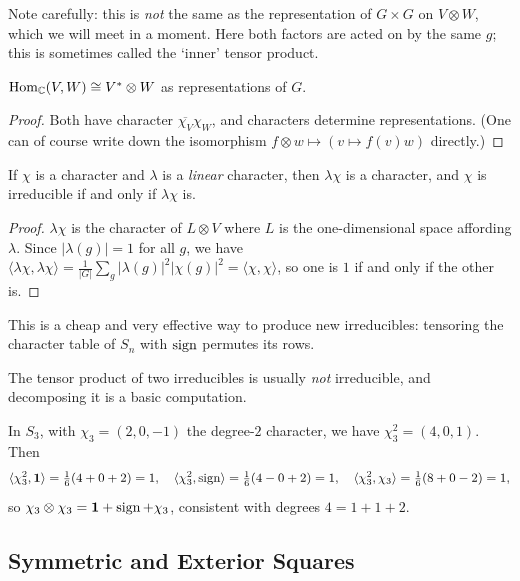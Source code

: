 \documentclass[a4paper]{scrartcl}
\newcommand{\Hom}{\operatorname{Hom}}
\newcommand{\ip}[2]{\langle #1, #2 \rangle}
\begin{document}
\begin{remark}
	Note carefully: this is \emph{not} the same as the representation of $G\times G$ on $V\otimes W$, which we will meet in a moment. Here both factors are acted on by the same $g$; this is sometimes called the `inner' tensor product.
\end{remark}

\begin{corollary}
	$\Hom_\C(V,W) \cong V^*\otimes W$ as representations of $G$.
\end{corollary}
\begin{proof}
	Both have character $\overline{\chi_V}\chi_W$, and characters determine representations. (One can of course write down the isomorphism $f\otimes w\mapsto (v\mapsto f(v)w)$ directly.)
\end{proof}

\begin{proposition}
	If $\chi$ is a character and $\lambda$ is a \emph{linear} character, then $\lambda\chi$ is a character, and $\chi$ is irreducible if and only if $\lambda\chi$ is.
\end{proposition}
\begin{proof}
	$\lambda\chi$ is the character of $L\otimes V$ where $L$ is the one-dimensional space affording $\lambda$. Since $|\lambda(g)| = 1$ for all $g$, we have $\ip{\lambda\chi}{\lambda\chi} = \frac1{|G|}\sum_g|\lambda(g)|^2|\chi(g)|^2 = \ip\chi\chi$, so one is $1$ if and only if the other is.
\end{proof}

This is a cheap and very effective way to produce new irreducibles: tensoring the character table of $S_n$ with $\operatorname{sign}$ permutes its rows.

The tensor product of two irreducibles is usually \emph{not} irreducible, and decomposing it is a basic computation.

\begin{example}
	In $S_3$, with $\chi_3 = (2,0,-1)$ the degree-$2$ character, we have $\chi_3^2 = (4,0,1)$. Then
	$$\ip{\chi_3^2}{\mathbf 1} = \tfrac16(4 + 0 + 2) = 1, \quad \ip{\chi_3^2}{\sign} = \tfrac16(4 - 0 + 2) = 1, \quad \ip{\chi_3^2}{\chi_3} = \tfrac16(8 + 0 - 2) = 1,$$
	so $\chi_3\otimes\chi_3 = \mathbf 1 + \operatorname{sign} + \chi_3$, consistent with degrees $4 = 1+1+2$.
\end{example}

\subsection{Symmetric and Exterior Squares}
\end{document}
